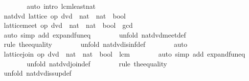 \begin{isabellebody}
\ \ \ \ \ \ \isamarkupfalse%
\ {\isacharparenleft}auto\ intro{\isacharcolon}\ lcm{\isacharunderscore}least{\isacharunderscore}nat{\isacharparenright}\isanewline
\ \ \ \ \ \ \isamarkupfalse%
\isanewline
\ \ \ \ \isamarkupfalse%
\ \isamarkupfalse%
\ nat{\isacharunderscore}dvd{\isacharcolon}\ lattice\ {\isachardoublequoteopen}op\ dvd\ {\isacharcolon}{\isacharcolon}\ nat\ {\isasymRightarrow}\ nat\ {\isasymRightarrow}\ bool{\isachardoublequoteclose}\ \isacommand{{\isachardot}}\isamarkupfalse%
\isanewline
\ \ \ \ \isamarkupfalse%
\ {\isachardoublequoteopen}lattice{\isachardot}meet\ {\isacharparenleft}op\ dvd\ {\isacharcolon}{\isacharcolon}\ nat\ {\isasymRightarrow}\ nat\ {\isasymRightarrow}\ bool{\isacharparenright}\ {\isacharequal}\ gcd{\isachardoublequoteclose}\isanewline
\ \ \ \ \ \ \isamarkupfalse%
\ {\isacharparenleft}auto\ simp\ add{\isacharcolon}\ expand{\isacharunderscore}fun{\isacharunderscore}eq{\isacharparenright}\isanewline
\ \ \ \ \ \ \isamarkupfalse%
\ {\isacharparenleft}unfold\ nat{\isacharunderscore}dvd{\isachardot}meet{\isacharunderscore}def{\isacharparenright}\isanewline
\ \ \ \ \ \ \isamarkupfalse%
\ {\isacharparenleft}rule\ the{\isacharunderscore}equality{\isacharparenright}\isanewline
\ \ \ \ \ \ \isamarkupfalse%
\ {\isacharparenleft}unfold\ nat{\isacharunderscore}dvd{\isachardot}is{\isacharunderscore}inf{\isacharunderscore}def{\isacharparenright}\isanewline
\ \ \ \ \ \ \isamarkupfalse%
\ auto\isanewline
\ \ \ \ \isamarkupfalse%
\ {\isachardoublequoteopen}lattice{\isachardot}join\ {\isacharparenleft}op\ dvd\ {\isacharcolon}{\isacharcolon}\ nat\ {\isasymRightarrow}\ nat\ {\isasymRightarrow}\ bool{\isacharparenright}\ {\isacharequal}\ lcm{\isachardoublequoteclose}\isanewline
\ \ \ \ \ \ \isamarkupfalse%
\ {\isacharparenleft}auto\ simp\ add{\isacharcolon}\ expand{\isacharunderscore}fun{\isacharunderscore}eq{\isacharparenright}\isanewline
\ \ \ \ \ \ \isamarkupfalse%
\ {\isacharparenleft}unfold\ nat{\isacharunderscore}dvd{\isachardot}join{\isacharunderscore}def{\isacharparenright}\isanewline
\ \ \ \ \ \ \isamarkupfalse%
\ {\isacharparenleft}rule\ the{\isacharunderscore}equality{\isacharparenright}\isanewline
\ \ \ \ \ \ \isamarkupfalse%
\ {\isacharparenleft}unfold\ nat{\isacharunderscore}dvd{\isachardot}is{\isacharunderscore}sup{\isacharunderscore}def{\isacharparenright}\isanewline

\end{isabellebody}
